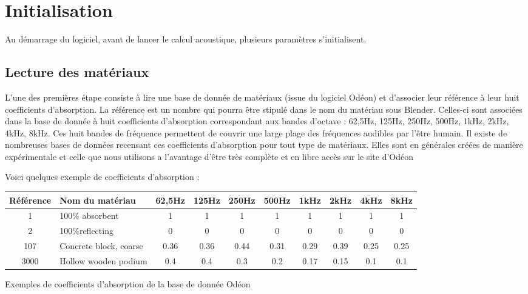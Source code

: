 \section{Initialisation}
Au démarrage du logiciel, avant de lancer le calcul acoustique, plusieurs paramètres s'initialisent.

\subsection{Lecture des matériaux}
L'une des premières étape consiste à lire une base de donnée de matériaux (issue du logiciel Odéon) et d'associer leur référence à leur huit coefficients d'absorption. La référence est un nombre qui pourra être stipulé dans le nom du matériau sous Blender. Celles-ci sont associées dans la base de donnée à huit coefficients d'absorption correspondant aux bandes d'octave : 62,5Hz, 125Hz, 250Hz, 500Hz, 1kHz, 2kHz, 4kHz, 8kHz. Ces huit bandes de fréquence permettent de couvrir une large plage des fréquences audibles par l'être humain. Il existe de nombreuses bases de données recensant ces coefficients d'absorption pour tout type de matériaux. Elles sont en générales créées de manière expérimentale et celle que nous utilisons a l'avantage d'être très complète et en libre accès sur le site d'Odéon \cite[Materials]{odeon}

Voici quelques exemple de coefficients d'absorption :
\begin{tableth}
\footnotesize
	\begin{tabular}{| c | m{2.5cm} | *{8}{c|}}
		\hline
		Référence & Nom du matériau & 62,5Hz & 125Hz & 250Hz & 500Hz & 1kHz & 2kHz & 4kHz & 8kHz \\
		  \hline
		  \hline
		   1 & 100\% absorbent & 1 & 1 & 1 & 1 & 1 & 1 & 1 & 1 \\
		   \hline
		2 & 100\%reflecting & 0 & 0 & 0 & 0 & 0 & 0 & 0 & 0 \\
		   \hline
		107 & Concrete block, coarse\footnotemark & 0.36 & 0.36 & 0.44 & 0.31 & 0.29 & 0.39 & 0.25 & 0.25 \\
		   \hline
		3000 & Hollow wooden podium\footnotemark & 0.4 & 0.4 & 0.3 & 0.2 & 0.17 & 0.15 & 0.1 & 0.1 \\
	     \hline
	 \end{tabular}
	\caption{Exemples de coefficients d'absorption de la base de donnée Odéon}
	\label{exempleOdeon}
\end{tableth}



